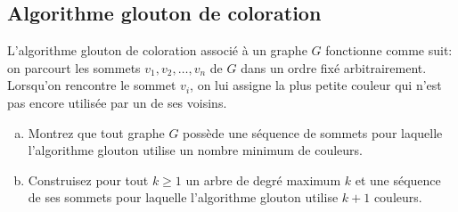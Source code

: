 \subsection{Algorithme glouton de coloration} 
L'algorithme glouton de coloration associé à un graphe $G$ fonctionne comme suit: on parcourt les sommets $v_1,v_2,…,v_n$ de $G$ dans un ordre fixé arbitrairement. Lorsqu'on rencontre le sommet $v_i$, on lui assigne la plus petite couleur qui n'est pas encore utilisée par un de ses voisins.

\begin{enumerate}[(a)]
  \item Montrez que tout graphe $G$ possède une séquence de sommets pour laquelle l'algorithme glouton utilise un nombre minimum de couleurs.
  \item Construisez pour tout $k \geq 1$ un arbre de degré maximum $k$ et une séquence de ses sommets pour laquelle l'algorithme glouton utilise $k+1$ couleurs.
\end{enumerate}

